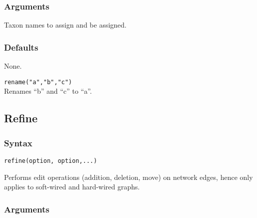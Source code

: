 	\subsubsection{Arguments}
		Taxon names to assign and be assigned.
		
	\subsubsection{Defaults}
		None.
		
	\begin{example}
	
		\item{\texttt{rename("a","b","c")}\\ Renames ``b'' and ``c'' to ``a''. }
				
	\end{example}

\subsection{Refine}
	\subsubsection{Syntax}
		\texttt{refine(option, option,...)}
		
	\begin{phygdescription}
		{Performs edit operations (addition, deletion, move) on network edges, hence only applies to 
		soft-wired and hard-wired graphs.}
	\end{phygdescription}

	\subsubsection{Arguments}
		
